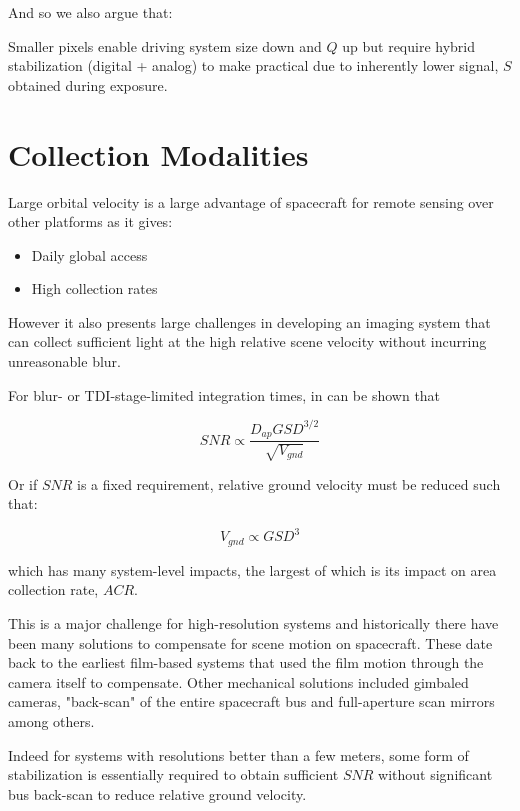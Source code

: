 \documentclass[10pt,journal]{IEEEtran}  %
\begin{document}
And so we also argue that:
\begin{observation}
\label{obs:small_pix}
Smaller pixels enable driving system size down and $Q$ up but require hybrid stabilization (digital + analog) to make practical due to inherently lower signal, $S$ obtained during exposure.
\end{observation}

\section{Collection Modalities}
\label{sec:modalities}
Large orbital velocity is a large advantage of spacecraft for remote sensing over other platforms as it gives:


\begin{itemize}
\item Daily global access
\item High collection rates
\end{itemize}

However it also presents large challenges in developing an imaging system that can collect sufficient light at the high relative scene velocity without incurring unreasonable blur.

For blur- or TDI-stage-limited integration times, in can be shown that \cite{shaw}

$$SNR \propto \frac{D_{ap} GSD^{3/2}}{\sqrt{V_{gnd}}}$$

Or if $SNR$ is a fixed requirement, relative ground velocity must be reduced such that:

\begin{equation}
V_{gnd} \propto GSD^3
\end{equation}

which has many system-level impacts, the largest of which is its impact on area collection rate, $ACR$.

This is a major challenge for high-resolution systems and historically there have been many solutions to compensate for scene motion on spacecraft.  These date back to the earliest film-based systems that used the film motion through the camera itself to compensate.  Other mechanical solutions included gimbaled cameras, "back-scan" of the entire spacecraft bus and full-aperture scan mirrors among others.

Indeed for systems with resolutions better than a few meters, some form of stabilization is essentially required to obtain sufficient $SNR$ without significant bus back-scan to reduce relative ground velocity.
\end{document}

